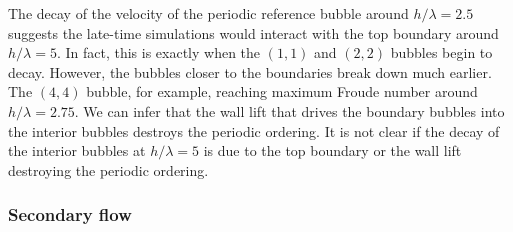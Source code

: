 The decay of the velocity of the periodic reference bubble around $h/\lambda = 2.5$ suggests the late-time simulations would interact with the top boundary around $h/\lambda = 5$.
In fact, this is exactly when the $(1,1)$ and $(2,2)$ bubbles begin to decay.
However, the bubbles closer to the boundaries break down much earlier.
The $(4,4)$ bubble, for example, reaching maximum Froude number around $h/\lambda = 2.75$.
We can infer that the wall lift that drives the boundary bubbles into the interior bubbles destroys the periodic ordering.
It is not clear if the decay of the interior bubbles at $h/\lambda = 5$ is due to the top boundary or the wall lift destroying the periodic ordering.

\subsubsection{Secondary flow}

